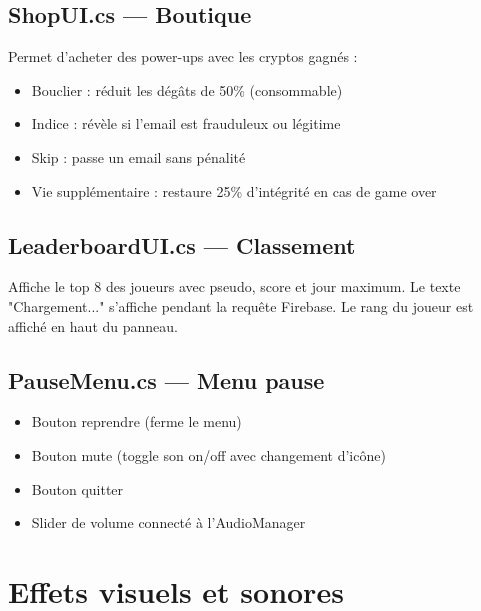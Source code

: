 \documentclass[12pt,a4paper]{article}
\begin{document}
\subsection{ShopUI.cs — Boutique}
Permet d'acheter des power-ups avec les cryptos gagnés :
\begin{itemize}
    \item Bouclier : réduit les dégâts de 50\% (consommable)
    \item Indice : révèle si l'email est frauduleux ou légitime
    \item Skip : passe un email sans pénalité
    \item Vie supplémentaire : restaure 25\% d'intégrité en cas de game over
\end{itemize}

\subsection{LeaderboardUI.cs — Classement}
Affiche le top 8 des joueurs avec pseudo, score et jour maximum. Le texte "Chargement..." s'affiche pendant la requête Firebase. Le rang du joueur est affiché en haut du panneau.

\subsection{PauseMenu.cs — Menu pause}
\begin{itemize}
    \item Bouton reprendre (ferme le menu)
    \item Bouton mute (toggle son on/off avec changement d'icône)
    \item Bouton quitter
    \item Slider de volume connecté à l'AudioManager
\end{itemize}

\section{Effets visuels et sonores}
\end{document}
